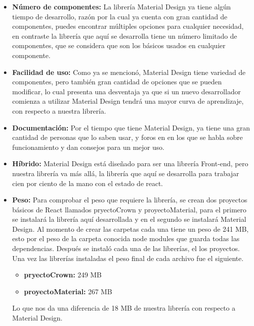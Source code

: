   \begin{itemize}
   \item \textbf{ Número de componentes:} La librería Material Design ya tiene algún tiempo de desarrollo, razón por la cual ya cuenta con gran cantidad de componentes, puedes encontrar múltiples opciones para cualquier necesidad, en contraste la librería que aquí se desarrolla tiene un número limitado de componentes, que se considera que son los básicos usados en cualquier componente.
   \item \textbf{ Facilidad de uso:} Como ya se mencionó, Material Design tiene variedad de componentes, pero también gran cantidad de opciones que se pueden modificar, lo cual presenta una desventaja ya que si un nuevo desarrollador comienza a utilizar Material Design tendrá una mayor curva de aprendizaje, con respecto a nuestra librería.
   \item \textbf{ Documentación:} Por el tiempo que tiene Material Design, ya tiene una gran cantidad de personas que lo saben usar, y foros en en los que se habla sobre funcionamiento y dan consejos para un mejor uso.
   \item \textbf{ Híbrido:} Material Design está diseñado para ser una librería Front-end, pero nuestra librería va más allá, la librería que aquí se desarrolla para trabajar cien por ciento de la mano con el estado de react. 
   \item \textbf{ Peso:} Para comprobar el peso que requiere la librería, se crean dos proyectos básicos de React \cite{CRA}  llamados pryectoCrown y proyectoMaterial, para el primero se instalará la librería aquí desarrollada y en el segundo se instalará Material Design.
Al momento de crear las carpetas cada una tiene un peso de 241 MB, esto por el peso de la carpeta conocida node modules que guarda todas las dependencias.
Después se instaló cada una de las librerías, el los proyectos. Una vez las librerías instaladas el peso final de cada archivo fue el siguiente.

 \begin{itemize}
  \item \textbf{pryectoCrown:}  249 MB
   \item \textbf{proyectoMaterial:}   267 MB
 \end{itemize}
 Lo que nos da una diferencia de 18 MB de nuestra librería con respecto a Material Design.
  \end{itemize}



